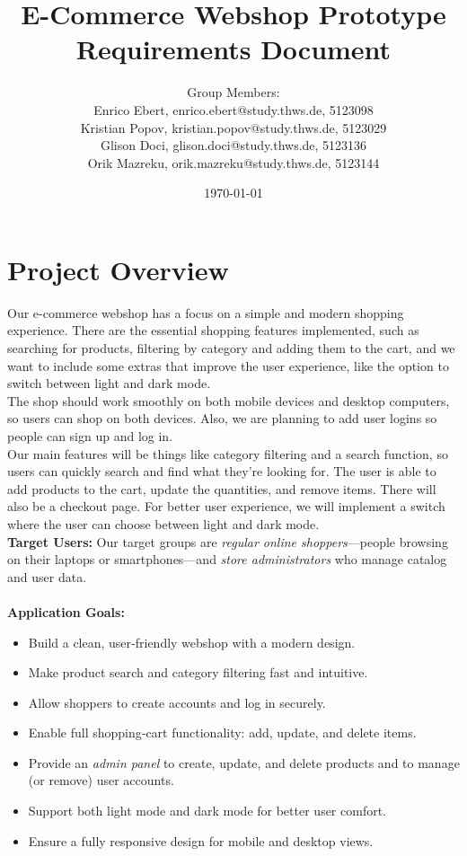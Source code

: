 \documentclass[a4paper,12pt]{article}
\title{E-Commerce Webshop Prototype \\
	Requirements Document}
\author{
	Group Members: \\
	Enrico Ebert, enrico.ebert@study.thws.de, 5123098 \\
	Kristian Popov, kristian.popov@study.thws.de, 5123029 \\
	Glison Doci, glison.doci@study.thws.de, 5123136 \\
	Orik Mazreku, orik.mazreku@study.thws.de, 5123144
}
\date{\today}
\begin{document}
	\maketitle

\section{Project Overview}


Our e-commerce webshop has a focus on a simple and modern shopping experience. There are the essential shopping features implemented, such as searching for products, filtering by category and adding them to the cart, and we want to include some extras that improve the user experience, like the option to switch between light and dark mode. \\


The shop should work smoothly on both mobile devices and desktop computers, so users can shop on both devices. Also, we are planning to add user logins so people can sign up and log in.\\


Our main features will be things like category filtering and a search function, so users can quickly search and find what they’re looking for. The user is able to add products to the cart, update the quantities, and remove items. There will also be a checkout page. For better user experience, we will implement a switch where the user can choose between light and dark mode.\\


\textbf{Target Users:}
Our target groups are \emph{regular online shoppers}—people browsing on their laptops or smartphones—and \emph{store administrators} who manage catalog and user data.\\\\


\textbf{Application Goals:}
\begin{itemize}
	\item Build a clean, user‑friendly webshop with a modern design.
	\item Make product search and category filtering fast and intuitive.
	\item Allow shoppers to create accounts and log in securely.
	\item Enable full shopping‑cart functionality: add, update, and delete items.
	\item Provide an \emph{admin panel} to create, update, and delete products and to manage (or remove) user accounts.
	\item Support both light mode and dark mode for better user comfort.
	\item Ensure a fully responsive design for mobile and desktop views.


\end{itemize}
\end{document}
